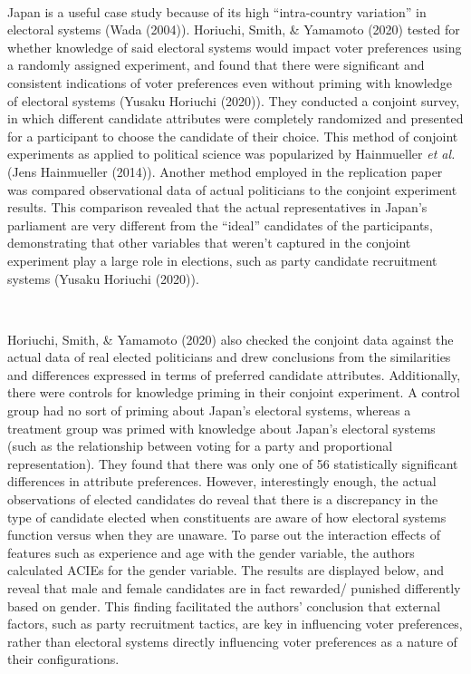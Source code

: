 \documentclass[
]{article}
\begin{document}
~

Japan is a useful case study because of its high ``intra-country variation'' in electoral systems (Wada (2004)). Horiuchi, Smith, \& Yamamoto (2020) tested for whether knowledge of said electoral systems would impact voter preferences using a randomly assigned experiment, and found that there were significant and consistent indications of voter preferences even without priming with knowledge of electoral systems (Yusaku Horiuchi (2020)). They conducted a conjoint survey, in which different candidate attributes were completely randomized and presented for a participant to choose the candidate of their choice. This method of conjoint experiments as applied to political science was popularized by Hainmueller \emph{et al.} (Jens Hainmueller (2014)). Another method employed in the replication paper was compared observational data of actual politicians to the conjoint experiment results. This comparison revealed that the actual representatives in Japan's parliament are very different from the ``ideal'' candidates of the participants, demonstrating that other variables that weren't captured in the conjoint experiment play a large role in elections, such as party candidate recruitment systems (Yusaku Horiuchi (2020)).

~

Horiuchi, Smith, \& Yamamoto (2020) also checked the conjoint data against the actual data of real elected politicians and drew conclusions from the similarities and differences expressed in terms of preferred candidate attributes. Additionally, there were controls for knowledge priming in their conjoint experiment. A control group had no sort of priming about Japan's electoral systems, whereas a treatment group was primed with knowledge about Japan's electoral systems (such as the relationship between voting for a party and proportional representation). They found that there was only one of 56 statistically significant differences in attribute preferences. However, interestingly enough, the actual observations of elected candidates do reveal that there is a discrepancy in the type of candidate elected when constituents are aware of how electoral systems function versus when they are unaware. To parse out the interaction effects of features such as experience and age with the gender variable, the authors calculated ACIEs for the gender variable. The results are displayed below, and reveal that male and female candidates are in fact rewarded/ punished differently based on gender. This finding facilitated the authors' conclusion that external factors, such as party recruitment tactics, are key in influencing voter preferences, rather than electoral systems directly influencing voter preferences as a nature of their configurations.
\end{document}
